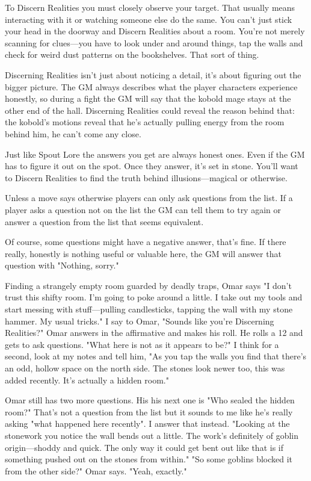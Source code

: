 To Discern Realities you must closely observe your target. That usually means interacting with it or watching someone else do the same. You can't just stick your head in the doorway and Discern Realities about a room. You're not merely scanning for clues—you have to look under and around things, tap the walls and check for weird dust patterns on the bookshelves. That sort of thing.

 

Discerning Realities isn't just about noticing a detail, it's about figuring out the bigger picture. The GM always describes what the player characters experience honestly, so during a fight the GM will say that the kobold mage stays at the other end of the hall. Discerning Realities could reveal the reason behind that: the kobold's motions reveal that he's actually pulling energy from the room behind him, he can't come any close.

 

Just like Spout Lore the answers you get are always honest ones. Even if the GM has to figure it out on the spot. Once they answer, it's set in stone. You'll want to Discern Realities to find the truth behind illusions—magical or otherwise.

 

Unless a move says otherwise players can only ask questions from the list. If a player asks a question not on the list the GM can tell them to try again or answer a question from the list that seems equivalent.

 

Of course, some questions might have a negative answer, that's fine. If there really, honestly is nothing useful or valuable here, the GM will answer that question with "Nothing, sorry."

 
\startExample
Finding a strangely empty room guarded by deadly traps, Omar says "I don't trust this shifty room. I'm going to poke around a little. I take out my tools and start messing with stuff—pulling candlesticks, tapping the wall with my stone hammer. My usual tricks." I say to Omar, "Sounds like you're Discerning Realities?" Omar answers in the affirmative and makes his roll. He rolls a 12 and gets to ask questions. "What here is not as it appears to be?" I think for a second, look at my notes and tell him, "As you tap the walls you find that there's an odd, hollow space on the north side. The stones look newer too, this was added recently. It's actually a hidden room."
\stopExample
 
\startExample
Omar still has two more questions. His his next one is "Who sealed the hidden room?" That's not a question from the list but it sounds to me like he's really asking "what happened here recently". I answer that instead. "Looking at the stonework you notice the wall bends out a little. The work's definitely of goblin origin—shoddy and quick. The only way it could get bent out like that is if something pushed out on the stones from within." "So some goblins blocked it from the other side?" Omar says. "Yeah, exactly."
\stopExample
 
